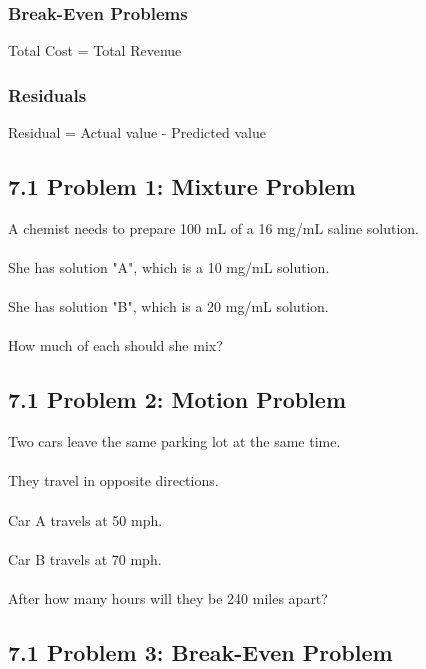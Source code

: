 \documentclass[12pt]{article}
\begin{document}
	        \subsubsection*{Break-Even Problems}
	    		Total Cost = Total Revenue
	
            \subsubsection*{Residuals}
		    	Residual = Actual value - Predicted value

            \newpage
	
        \subsection*{7.1 Problem 1: Mixture Problem}
            
            A chemist needs to prepare 100 mL of a 16 mg/mL saline solution.\\\\
            She has solution "A", which is a 10 mg/mL solution.\\\\
            She has solution "B", which is a 20 mg/mL solution.\\\\
            How much of each should she mix?

            \newpage
        
        \subsection*{7.1 Problem 2: Motion Problem}

            Two cars leave the same parking lot at the same time.\\\\
            They travel in opposite directions.\\\\
            Car A travels at 50 mph.\\\\
            Car B travels at 70 mph.\\\\
            After how many hours will they be 240 miles apart?
        
            \newpage
        
        \subsection*{7.1 Problem 3: Break-Even Problem}
        
\end{document}
